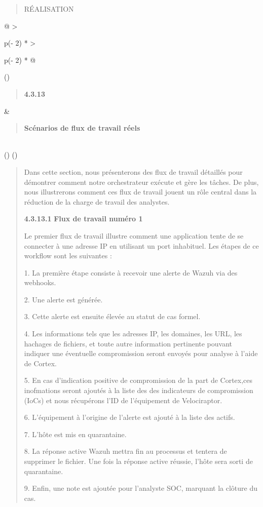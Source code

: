 \documentclass[
]{article}
\begin{document}
\begin{quote}
RÉALISATION
\end{quote}

\begin{longtable}[]{@{}
  >{\raggedright\arraybackslash}p{(\columnwidth - 2\tabcolsep) * }
  >{\raggedright\arraybackslash}p{(\columnwidth - 2\tabcolsep) * }@{}}
\toprule()
\begin{minipage}[b]{\linewidth}\raggedright
\begin{quote}
\textbf{4.3.13}
\end{quote}
\end{minipage} & \begin{minipage}[b]{\linewidth}\raggedright
\begin{quote}
\textbf{Scénarios de flux de travail réels}
\end{quote}
\end{minipage} \\
\midrule()
\endhead
\bottomrule()
\end{longtable}

\begin{quote}
Dans cette section, nous présenterons des flux de travail détaillés pour
démontrer comment notre orchestrateur exécute et gère les tâches. De
plus, nous illustrerons comment ces flux de travail jouent un rôle
central dans la réduction de la charge de travail des analystes.

\textbf{4.3.13.1} \textbf{Flux de travail numéro 1}

Le premier flux de travail illustre comment une application tente de se
connecter à une adresse IP en utilisant un port inhabituel. Les étapes
de ce workflow sont les suivantes :

1. La première étape consiste à recevoir une alerte de Wazuh via des
webhooks.

2. Une alerte est générée.

3. Cette alerte est ensuite élevée au statut de cas formel.

4. Les informations tels que les adresses IP, les domaines, les URL, les
hachages de fichiers, et toute autre information pertinente pouvant
indiquer une éventuelle compromission seront envoyés pour analyse à
l'aide de Cortex.

5. En cas d'indication positive de compromission de la part de
Cortex,ces inofmations seront ajoutés à la liste des des indicateurs de
compromission (IoCs) et nous récupérons l'ID de l'équipement de
Velociraptor.

6. L'équipement à l'origine de l'alerte est ajouté à la liste des
actifs.

7. L'hôte est mis en quarantaine.

8. La réponse active Wazuh mettra fin au processus et tentera de
supprimer le fichier. Une fois la réponse active réussie, l'hôte sera
sorti de quarantaine.

9. Enfin, une note est ajoutée pour l'analyste SOC, marquant la clôture
du cas.
\end{quote}
\end{document}
